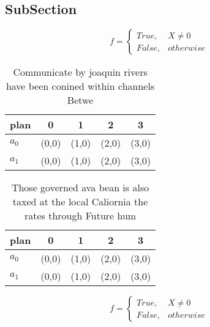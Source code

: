 \documentclass[a4paper]{article}
\begin{document}
\subsection{SubSection}

\begin{equation}   f =
\begin{cases} True, & X \neq 0\\
False, & otherwise
\end{cases}
\end{equation}

\begin{table}
\begin{adjustbox}{width=0.5\columnwidth}
\begin{tabular}{|l|l|l|l|l|}
\hline
\textbf{plan} & \multicolumn{1}{c|}{\textbf{0}} & \multicolumn{1}{c|}{\textbf{1}} & \multicolumn{1}{c|}{\textbf{2}} & \multicolumn{1}{c|}{\textbf{3}} \\ \hline
\textbf{$a_0$}  & (0,0) & (1,0) & (2,0) & (3,0) \\ \hline
\textbf{$a_1$}  & (0,0) & (1,0) & (2,0) & (3,0) \\ \hline
\end{tabular}
\end{adjustbox}
\caption{Communicate by joaquin rivers have been conined within channels Betwe
}
\end{table}

\begin{table}
\begin{adjustbox}{width=0.5\columnwidth}
\begin{tabular}{|l|l|l|l|l|}
\hline
\textbf{plan} & \multicolumn{1}{c|}{\textbf{0}} & \multicolumn{1}{c|}{\textbf{1}} & \multicolumn{1}{c|}{\textbf{2}} & \multicolumn{1}{c|}{\textbf{3}} \\ \hline
\textbf{$a_0$}  & (0,0) & (1,0) & (2,0) & (3,0) \\ \hline
\textbf{$a_1$}  & (0,0) & (1,0) & (2,0) & (3,0) \\ \hline
\end{tabular}
\end{adjustbox}
\caption{Those governed ava bean is also taxed at the local Caliornia the rates through Future hum
}
\end{table}

\begin{equation}   f =
\begin{cases} True, & X \neq 0\\
False, & otherwise
\end{cases}
\end{equation}
\end{document}
